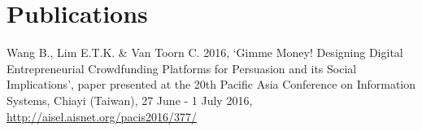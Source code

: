 \section*{Publications}

\noindent
Wang B., Lim E.T.K. \& Van Toorn C. 2016, `Gimme Money! Designing Digital Entrepreneurial Crowdfunding Platforms for Persuasion and its Social Implications', paper presented at the 20th Pacific Asia Conference on Information Systems, Chiayi (Taiwan), 27 June - 1 July 2016, \url{http://aisel.aisnet.org/pacis2016/377/}